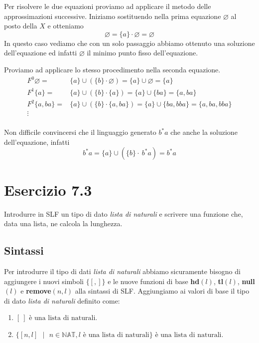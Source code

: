 		Per risolvere le due equazioni proviamo ad applicare il metodo delle approssimazioni successive. Iniziamo sostituendo nella prima equazione $\varnothing$ al posto della $X$ e otteniamo $$\varnothing = \{a\} \cdot \varnothing = \varnothing$$ 
		In questo caso vediamo che con un solo passaggio abbiamo ottenuto una soluzione dell'equazione ed infatti $\varnothing$ \eacc il minimo punto fisso dell'equazione.
		
		Proviamo ad applicare lo stesso procedimento nella seconda equazione.
		\begin{align*}
			F^{0}\varnothing = & \{a\}\cup (\{b\}\cdot \varnothing) = \{a\}\cup \varnothing = \{a\}\\
			F^{1}\{a\} = & \{a\} \cup (\{b\}\cdot \{a\}) = \{a\}\cup \{ba\} = \{a,ba\}\\
			F^{2}\{a,ba\} = & \{a\} \cup (\{b\} \cdot \{a,ba\}) = \{a\}\cup \{ba,bba\} = \{a,ba,bba\}\\
			\vdots\\
		\end{align*}
		
		Non \eacc difficile convincersi che il linguaggio generato \eacc $b^* a$ che \eacc anche la soluzione dell'equazione, infatti $$b^* a = \{a\} \cup (\{b\} \cdot \ b^* a) = b^* a$$
		
		\newpage
		
	\section{Esercizio 7.3}
		Introdurre in SLF un tipo di dato \emph{lista di naturali} e scrivere
		una funzione che, data una lista, ne calcola la lunghezza.
		
		\sectionline
		
		\subsection{Sintassi}
		
		Per introdurre il tipo di dati \emph{lista di naturali} abbiamo
		sicuramente bisogno di aggiungere i nuovi simboli $\{[,]\}$ e le nuove
		funzioni di base \textbf{hd}$(l)$, \textbf{tl}$(l)$, \textbf{null}$(l)$ e
		\textbf{remove}$(n,l)$ alla sintassi di SLF. Aggiungiamo ai valori di base il tipo di dato
		\emph{lista di naturali} definito come: 
		\begin{enumerate}
			\item $[\ ]\text{ \`e una lista di naturali.}$
			\item $\{[n,l]\text{ }|\text{ }n \in
			\mathbb{NAT},l\text{ \`e una lista di naturali}\}\text{ \`e una lista di naturali.}$
		\end{enumerate}
		
